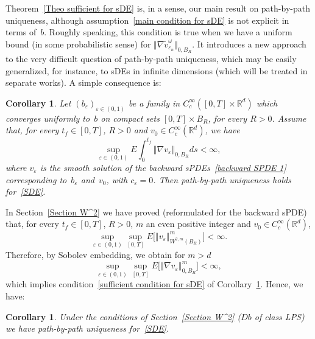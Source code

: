 \documentclass[a4paper,10pt]{article}
\newtheorem{corollary}[theorem]{Corollary}
\newcommand\1{\mathbbm{1}}
\newcommand{\eps}{\varepsilon}
\numberwithin{equation}{section}
\begin{document}
Theorem~\ref{Theo sufficient for sDE} is, in a sense, our main result on path-by-path uniqueness, although assumption~\eqref{main condition for sDE} is not explicit in terms of~$b$. Roughly speaking, this condition is true when we have a uniform bound (in some probabilistic sense) for $\Vert \nabla\widetilde{v}_{\eps_{n}}^\omega \Vert_{0,B_R}$. It introduces a new approach to the very difficult question of path-by-path uniqueness, which may be easily generalized, for instance, to sDEs in infinite dimensions (which will be treated in separate works). A simple consequence is:

\begin{corollary}
\label{Coroll sufficient for sDE}
Let $(b_{\eps})_{\eps\in(0,1)}$ be a family in $C_{c}^{\infty}([0,T] \times\mathbb{R}^{d})$ which converges uniformly to~$b$ on compact sets $[0,T]  \times B_{R}$,
for every $R>0$. Assume that, for every $t_{f}\in [0,T]  $, $R>0$ and $v_{0}\in C_{c}^{\infty}(\mathbb{R}^{d})$, we have
\begin{equation}
\sup_{\eps\in(  0,1)  }E\int_{0}^{t_{f}}\left\Vert \nabla
v_{\eps}\right\Vert _{0,B_R}ds<\infty , \label{sufficient condition for sDE}
\end{equation}
where $v_{\eps}$ is the smooth solution of the backward sPDEs~\eqref{backward SPDE 1} corresponding to~$b_{\eps}$ and~$v_{0}$, with $c_{\eps}=0$. Then path-by-path uniqueness holds for~\eqref{SDE}.
\end{corollary}

In Section~\ref{Section W^2} we have proved (reformulated for the backward sPDE) that, for every $t_{f}\in [0,T]  $, $R>0$, $m$ an even positive integer and $v_{0}\in C_{c}^{\infty}(\mathbb{R}^{d})$,
\begin{equation*}
\sup_{\eps\in (0,1)  }\sup_{[0,T]  }E \Big[\left\Vert v_{\eps}\right\Vert _{W^{2,m}( B_{R})} 
^{m}\Big]  <\infty .
\end{equation*}
Therefore, by Sobolev embedding, we obtain for $m >d$ 
\begin{equation}
\sup_{\eps\in (0,1)}\sup_{[0,T]  }E \Big[ \left\Vert \nabla v_{\eps}\right\Vert _{0,B_R}^{m}\Big]  <\infty, \label{uniform estimate grad u} 
\end{equation}
which implies condition~\eqref{sufficient condition for sDE} of Corollary~\ref{Coroll sufficient for sDE}. Hence, we have:

\begin{corollary}
Under the conditions of Section~\ref{Section W^2} \textup{(}$Db$ of class LPS\textup{)} we have path-by-path uniqueness for~\eqref{SDE}.
\end{corollary}
\end{document}
